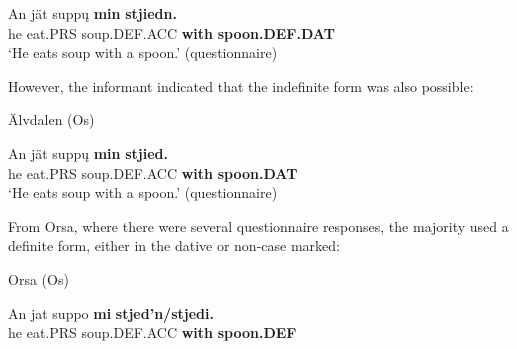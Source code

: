  \ea\label{}
\gll An  jät  supp\k{u}  \textbf{min}\textbf{  stjiedn.}\\


he  eat.PRS  soup.DEF.ACC  \textbf{with} \textbf{spoon.DEF.DAT}\\

\glt ‘He eats soup with a spoon.’ (questionnaire)

\z

However, the informant indicated that the indefinite form was also possible:


\item 

Älvdalen (Os)



 \ea\label{}
\gll An  jät  supp\k{u}  \textbf{min}\textbf{  stjied.}\\


he  eat.PRS  soup.DEF.ACC  \textbf{with} \textbf{spoon.DAT}\\

\glt ‘He eats soup with a spoon.’ (questionnaire)

\z

From Orsa, where there were several questionnaire responses, the majority used a definite form, either in the dative or non-case marked:


\item 

Orsa (Os)



 \ea\label{}
\gll An  jat  suppo  \textbf{mi}\textbf{  stjed’n/stjedi.}\\


he  eat.PRS  soup.DEF.ACC  \textbf{with} \textbf{spoon.DEF}\\


